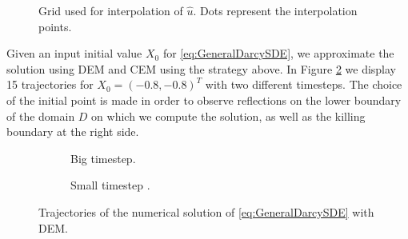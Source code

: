 \begin{figure}[t]
    \centering
    \resizebox{0.6\linewidth}{!}{ }  
    \caption{Grid used for interpolation of $\hat{u}$. Dots represent the interpolation points.}
    \label{fig:GridVelocity}
\end{figure}
\noindent Given an input initial value $X_0$ for \eqref{eq:GeneralDarcySDE}, we approximate the solution using DEM and CEM using the strategy above. In Figure \ref{fig:TrajSDEDarcy} we display 15 trajectories for $X_0 = (-0.8,-0.8)^T$ with two different timesteps. The choice of the initial point is made in order to observe reflections on the lower boundary of the domain $D$ on which we compute the solution, as well as the killing boundary at the right side. 

\begin{figure}[t]
    \centering
    \begin{subfigure}{0.49\linewidth}
        \centering
        \resizebox{1\linewidth}{!}{ }  
        \caption{Big timestep.}
    \end{subfigure}
    \begin{subfigure}{0.49\linewidth}
        \centering
        \resizebox{1\linewidth}{!}{ }  
        \caption{Small timestep .}
    \end{subfigure}    
    \caption{Trajectories of the numerical solution of \eqref{eq:GeneralDarcySDE} with DEM.}
    \label{fig:TrajSDEDarcy}
\end{figure}

